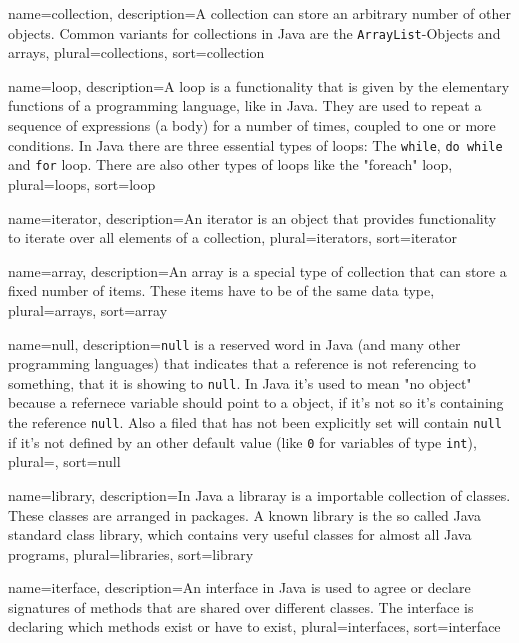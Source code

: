 {
	name=collection,
	description={A collection can store an arbitrary number of other 
		objects. Common variants for collections in Java are the
		\lstinline?ArrayList?-Objects and arrays},
	plural=collections,
	sort=collection
}

{
	name=loop,
	description={A loop is a functionality that is given by the 
		elementary functions of a programming language, like in Java.
		They are used to repeat a sequence of expressions (a body)
		for a number of times, coupled to one or more conditions.
		In Java there are three essential types of loops: 
		The \lstinline?while?, \lstinline?do while? and
		\lstinline?for? loop. There are also other types of loops
		like the "foreach" loop},
	plural=loops,
	sort=loop
}

{
	name=iterator,
	description={An iterator is an object that provides functionality to
		iterate over all elements of a collection},
	plural=iterators,
	sort=iterator
}

{
	name=array,
	description={An array is a special type of collection that can store
		a fixed number of items. These items have to be of the same 
		data type},
	plural=arrays,
	sort=array
}

{
	name=null,
	description={\lstinline?null? is a reserved word in Java (and many
		other programming languages) that indicates that a reference
		is not referencing to something, that it is showing to 
		\lstinline?null?. In Java it's used to mean "no object" 
		because a refernece variable should point to a object, if it's
		not so it's containing the reference \lstinline?null?. Also
		a filed that has not been explicitly set will contain 
		\lstinline?null? if it's not defined by an other default value
		(like \lstinline?0? for variables of type  \lstinline?int?)},
	plural=,
	sort=null
}

{
	name=library,
	description={In Java a libraray is a importable collection of classes.
		These classes are arranged in packages. A known library is 
		the so called Java standard class library, which contains
		very useful classes for almost all Java programs},
	plural=libraries,
	sort=library
}

{
	name=iterface,
	description={An interface in Java is used to agree
		or declare signatures of methods that are shared over 
		different classes. The interface is declaring which
		methods exist or have to exist},
	plural=interfaces,
	sort=interface
}

